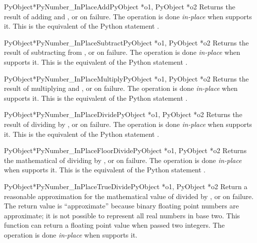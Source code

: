 \begin{cfuncdesc}{PyObject*}{PyNumber_InPlaceAdd}{PyObject *o1, PyObject *o2}
  Returns the result of adding  and , or \NULL{} on
  failure.  The operation is done \emph{in-place} when 
  supports it.  This is the equivalent of the Python statement
  .
\end{cfuncdesc}


\begin{cfuncdesc}{PyObject*}{PyNumber_InPlaceSubtract}{PyObject *o1,
                                                       PyObject *o2}
  Returns the result of subtracting  from , or \NULL{}
  on failure.  The operation is done \emph{in-place} when 
  supports it.  This is the equivalent of the Python statement
  .
\end{cfuncdesc}


\begin{cfuncdesc}{PyObject*}{PyNumber_InPlaceMultiply}{PyObject *o1,
                                                       PyObject *o2}
  Returns the result of multiplying  and , or \NULL{}
  on failure.  The operation is done \emph{in-place} when 
  supports it.  This is the equivalent of the Python statement
  .
\end{cfuncdesc}


\begin{cfuncdesc}{PyObject*}{PyNumber_InPlaceDivide}{PyObject *o1,
                                                     PyObject *o2}
  Returns the result of dividing  by , or \NULL{} on
  failure.  The operation is done \emph{in-place} when 
  supports it. This is the equivalent of the Python statement
  .
\end{cfuncdesc}


\begin{cfuncdesc}{PyObject*}{PyNumber_InPlaceFloorDivide}{PyObject *o1,
                                                          PyObject *o2}
  Returns the mathematical of dividing  by , or
  \NULL{} on failure.  The operation is done \emph{in-place} when
   supports it.  This is the equivalent of the Python
  statement .
\end{cfuncdesc}


\begin{cfuncdesc}{PyObject*}{PyNumber_InPlaceTrueDivide}{PyObject *o1,
                                                         PyObject *o2}
  Return a reasonable approximation for the mathematical value of
   divided by , or \NULL{} on failure.  The return
  value is ``approximate'' because binary floating point numbers are
  approximate; it is not possible to represent all real numbers in
  base two.  This function can return a floating point value when
  passed two integers.  The operation is done \emph{in-place} when
   supports it.
\end{cfuncdesc}


